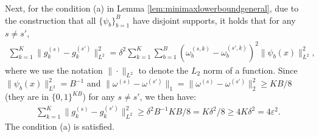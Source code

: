 \documentclass[preprint,11pt]{article}
\numberwithin{equation}{section}
\begin{document}
Next, for the condition (a) in Lemma \ref{lem:minimaxlowerboundgeneral}, due to the construction that all $\{\psi_b\}_{b=1}^B$ have disjoint supports, it holds that for any $s\neq s'$,
\begin{align*}
    \sum_{k=1}^K\|g_k^{(s)}-g^{(s')}_k\|_{L^2}^2=\delta^2\sum_{k=1}^K \sum_{b=1}^B(\omega_b^{(s,k)}-\omega_b^{(s',k)})^2\|\psi_b(x)\|_{L^2}^2,
\end{align*}
where we use the notation $\|\cdot\|_{L^2}$ to denote the $L_2$ norm of a function. Since $\|\psi_b(x)\|_{L^2}^2=B^{-1}$ and $\|\omega^{(s)}-\omega^{(s')}\|_1=\|\omega^{(s)}-\omega^{(s')}\|_2^2\ge KB/8$ (they are in $\{0,1\}^{KB}$) for any $s\neq s'$, we then have:
\begin{align*}
    \sum_{k=1}^K\|g_k^{(s)}-g^{(s')}_k\|_{L^2}^2\ge \delta^2B^{-1}KB/8=K\delta^2/8\ge 4K\delta^2= 4\varepsilon^2.
\end{align*}
The condition (a) is satisfied.
\end{document}
